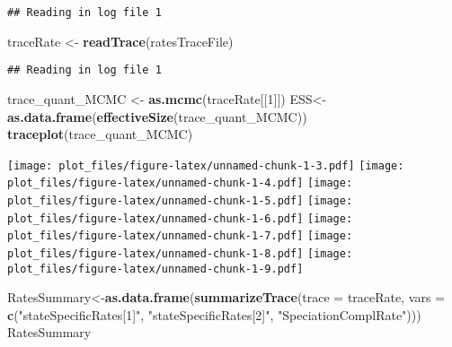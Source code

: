 \documentclass[
]{article}
\newenvironment{Shaded}{\begin{snugshade}}{\end{snugshade}}
\newcommand{\AttributeTok}[1]{\textcolor[rgb]{0.13,0.29,0.53}{#1}}
\newcommand{\DecValTok}[1]{\textcolor[rgb]{0.00,0.00,0.81}{#1}}
\newcommand{\FunctionTok}[1]{\textcolor[rgb]{0.13,0.29,0.53}{\textbf{#1}}}
\newcommand{\NormalTok}[1]{#1}
\newcommand{\OtherTok}[1]{\textcolor[rgb]{0.56,0.35,0.01}{#1}}
\newcommand{\StringTok}[1]{\textcolor[rgb]{0.31,0.60,0.02}{#1}}
\begin{document}
\begin{verbatim}
## Reading in log file 1
\end{verbatim}

\begin{Shaded}
\begin{Highlighting}[]
\NormalTok{traceRate }\OtherTok{\textless{}{-}} \FunctionTok{readTrace}\NormalTok{(ratesTraceFile)}
\end{Highlighting}
\end{Shaded}

\begin{verbatim}
## Reading in log file 1
\end{verbatim}

\begin{Shaded}
\begin{Highlighting}[]
\NormalTok{trace\_quant\_MCMC }\OtherTok{\textless{}{-}} \FunctionTok{as.mcmc}\NormalTok{(traceRate[[}\DecValTok{1}\NormalTok{]])}
\NormalTok{ESS}\OtherTok{\textless{}{-}}\FunctionTok{as.data.frame}\NormalTok{(}\FunctionTok{effectiveSize}\NormalTok{(trace\_quant\_MCMC))}
\FunctionTok{traceplot}\NormalTok{(trace\_quant\_MCMC)}
\end{Highlighting}
\end{Shaded}

\texttt{[image: plot\_files/figure-latex/unnamed-chunk-1-3.pdf]}
\texttt{[image: plot\_files/figure-latex/unnamed-chunk-1-4.pdf]}
\texttt{[image: plot\_files/figure-latex/unnamed-chunk-1-5.pdf]}
\texttt{[image: plot\_files/figure-latex/unnamed-chunk-1-6.pdf]}
\texttt{[image: plot\_files/figure-latex/unnamed-chunk-1-7.pdf]}
\texttt{[image: plot\_files/figure-latex/unnamed-chunk-1-8.pdf]}
\texttt{[image: plot\_files/figure-latex/unnamed-chunk-1-9.pdf]}

\begin{Shaded}
\begin{Highlighting}[]
\NormalTok{RatesSummary}\OtherTok{\textless{}{-}}\FunctionTok{as.data.frame}\NormalTok{(}\FunctionTok{summarizeTrace}\NormalTok{(}\AttributeTok{trace =}\NormalTok{ traceRate, }
                                           \AttributeTok{vars =}  \FunctionTok{c}\NormalTok{(}\StringTok{"stateSpecificRates[1]"}\NormalTok{,}
                                                     \StringTok{"stateSpecificRates[2]"}\NormalTok{,}
                                                     \StringTok{"SpeciationComplRate"}\NormalTok{)))}
\NormalTok{RatesSummary}
\end{Highlighting}
\end{Shaded}
\end{document}

